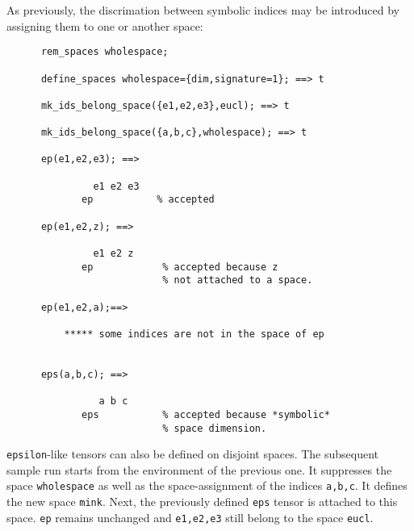 As previously, the discrimation between symbolic indices 
may be introduced 
by assigning them to one or another space:
\begin{verbatim}
      rem_spaces wholespace;

      define_spaces wholespace={dim,signature=1}; ==> t

      mk_ids_belong_space({e1,e2,e3},eucl); ==> t

      mk_ids_belong_space({a,b,c},wholespace); ==> t

      ep(e1,e2,e3); ==>

               e1 e2 e3
             ep           % accepted

      ep(e1,e2,z); ==>

               e1 e2 z
             ep            % accepted because z
                           % not attached to a space.

      ep(e1,e2,a);==>

          ***** some indices are not in the space of ep


      eps(a,b,c); ==>

                a b c
             eps           % accepted because *symbolic*
                           % space dimension.
\end{verbatim}
\texttt{epsilon}-like tensors can also be defined on disjoint spaces. 
The subsequent sample run starts from the environment of the previous one.
It suppresses the space \texttt{wholespace} as well as the 
space-assignment of the indices \texttt{a,b,c}. It  defines the new space
\texttt{mink}. Next, the previously defined  \texttt{eps} tensor is attached 
to this space. \texttt{ep} remains unchanged and \texttt{e1,e2,e3} still
belong to the space \texttt{eucl}.  
